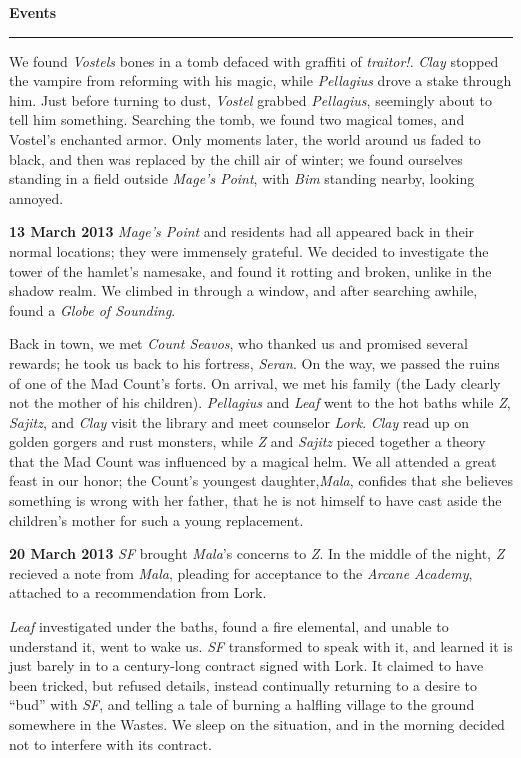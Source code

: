 \documentclass[letterpaper]{article}
\newcommand{\e}[1]{\emph{#1}}
\newcommand{\B}[1]{\textbf{#1}}
\newenvironment{notesection}[1]
{ {\huge \B{#1}}\hrule\vspace{0.5em}\begingroup\fontsize{9pt}{12pt}\selectfont}
{\endgroup}
\begin{document}
\begin{notesection}{Events}
We found \e{Vostels} bones in a tomb defaced with graffiti of \e{traitor!}. \e{Clay} stopped the vampire from reforming with his magic, while \e{Pellagius} drove a stake through him. Just before turning to dust, \e{Vostel} grabbed \e{Pellagius}, seemingly about to tell him something. Searching the tomb, we found two magical tomes, and Vostel's enchanted armor. Only moments later, the world around us faded to black, and then was replaced by the chill air of winter; we found ourselves standing in a field outside \e{Mage's Point}, with \e{Bim} standing nearby, looking annoyed.

\B{13 March 2013} \e{Mage's Point} and residents had all appeared back in their normal locations; they were immensely grateful.  We decided to investigate the tower of the hamlet's namesake, and found it rotting and broken, unlike in the shadow realm.  We climbed in through a window, and after searching awhile, found a \e{Globe of Sounding}.

Back in town, we met \e{Count Seavos}, who thanked us and promised several rewards; he took us back to his fortress, \e{Seran}. On the way, we passed the ruins of one of the Mad Count's forts.  On arrival, we met his family (the Lady clearly not the mother of his children). \e{Pellagius} and \e{Leaf} went to the hot baths while \e{Z}, \e{Sajitz}, and \e{Clay} visit the library and meet counselor \e{Lork}.  \e{Clay} read up on golden gorgers and rust monsters, while \e{Z} and \e{Sajitz} pieced together a theory that the Mad Count was influenced by a magical helm. We all attended a great feast in our honor; the Count's youngest daughter,\e{Mala}, confides that she believes something is wrong with her father, that he is not himself to have cast aside the children's mother for such a young replacement.

\B{20 March 2013} \e{SF} brought \e{Mala}'s concerns to \e{Z}. In the middle of the night, \e{Z} recieved a note from \e{Mala}, pleading for acceptance to the \e{Arcane Academy}, attached to a recommendation from Lork.

\e{Leaf} investigated under the baths, found a fire elemental, and unable to understand it, went to wake us. \e{SF} transformed to speak with it, and learned it is just barely in to a century-long contract signed with Lork.  It claimed to have been tricked, but refused details, instead continually returning to a desire to ``bud'' with \e{SF}, and telling a tale of burning a halfling village to the ground somewhere in the Wastes. We sleep on the situation, and in the morning decided not to interfere with its contract.


\end{notesection}
\end{document}
